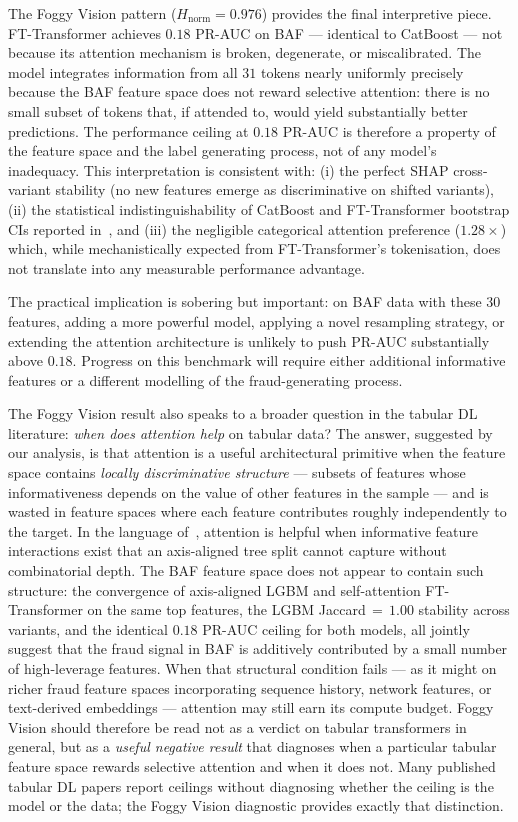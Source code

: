 \documentclass[a4paper,fleqn]{cas-sc}
\begin{document}
The Foggy Vision pattern ($H_{\text{norm}} = 0.976$) provides the final interpretive
piece.
FT-Transformer achieves $0.18$ PR-AUC on BAF --- identical to CatBoost --- not
because its attention mechanism is broken, degenerate, or miscalibrated.
The model integrates information from all $31$ tokens nearly uniformly precisely
because the BAF feature space does not reward selective attention: there is no
small subset of tokens that, if attended to, would yield substantially better
predictions.
The performance ceiling at $0.18$ PR-AUC is therefore a property of the feature
space and the label generating process, not of any model's inadequacy.
This interpretation is consistent with: (i) the perfect SHAP cross-variant stability
(no new features emerge as discriminative on shifted variants), (ii) the
statistical indistinguishability of CatBoost and FT-Transformer bootstrap CIs
reported in~\citet{caixeiro2025threshold}, and (iii) the negligible categorical
attention preference ($1.28\times$) which, while mechanistically expected from
FT-Transformer's tokenisation, does not translate into any measurable performance
advantage.

The practical implication is sobering but important: on BAF data with these
$30$ features, adding a more powerful model, applying a novel resampling strategy,
or extending the attention architecture is unlikely to push PR-AUC substantially
above $0.18$.
Progress on this benchmark will require either additional informative features
or a different modelling of the fraud-generating process.

The Foggy Vision result also speaks to a broader question in the tabular DL
literature: \emph{when does attention help} on tabular data?
The answer, suggested by our analysis, is that attention is a useful
architectural primitive when the feature space contains \emph{locally
discriminative structure} --- subsets of features whose informativeness depends
on the value of other features in the sample --- and is wasted in feature spaces
where each feature contributes roughly independently to the target.
In the language of~\citet{grinsztajn2022tree}, attention is helpful when
informative feature interactions exist that an axis-aligned tree split cannot
capture without combinatorial depth.
The BAF feature space does not appear to contain such structure: the
convergence of axis-aligned LGBM and self-attention FT-Transformer on the same
top features, the LGBM Jaccard\,$=\,1.00$ stability across variants, and the
identical $0.18$ PR-AUC ceiling for both models, all jointly suggest that the
fraud signal in BAF is additively contributed by a small number of high-leverage
features.
When that structural condition fails --- as it might on richer fraud feature
spaces incorporating sequence history, network features, or text-derived
embeddings --- attention may still earn its compute budget.
Foggy Vision should therefore be read not as a verdict on tabular transformers
in general, but as a \emph{useful negative result} that diagnoses when a
particular tabular feature space rewards selective attention and when it does
not.
Many published tabular DL papers report ceilings without diagnosing whether
the ceiling is the model or the data; the Foggy Vision diagnostic provides
exactly that distinction.
\end{document}
